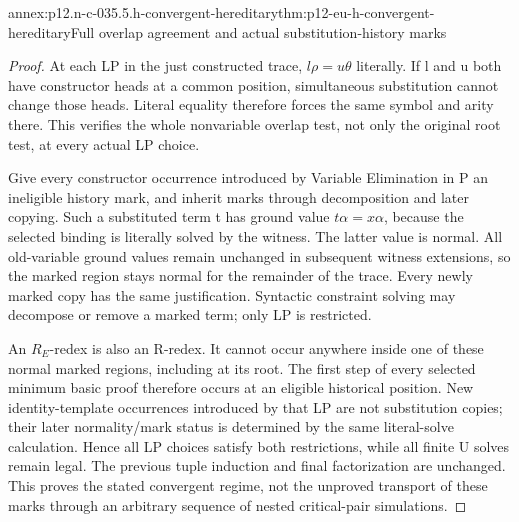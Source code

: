 \begin{annexitem}{annex:p12.n-c-035.5.h-convergent-hereditary}{thm:p12-eu-h-convergent-hereditary}{Full overlap agreement and actual substitution-history marks}
\begin{proof}
At each LP in the just constructed trace, \(l\rho=u\theta\)
literally. If l and u both have constructor heads at a common
position, simultaneous substitution cannot change those heads.
Literal equality therefore forces the same symbol and arity
there. This verifies the whole nonvariable overlap test, not
only the original root test, at every actual LP choice.

Give every constructor occurrence introduced by Variable
Elimination in P an ineligible history mark, and inherit marks
through decomposition and later copying. Such a substituted
term t has ground value \(t\alpha=x\alpha\), because the
selected binding is literally solved by the witness. The latter
value is normal. All old-variable ground values remain unchanged
in subsequent witness extensions, so the marked region stays
normal for the remainder of the trace. Every newly marked copy
has the same justification. Syntactic constraint solving may
decompose or remove a marked term; only LP is restricted.

An \(R_E\)-redex is also an R-redex. It cannot occur anywhere
inside one of these normal marked regions, including at its
root. The first step of every selected minimum basic proof
therefore occurs at an eligible historical position. New
identity-template occurrences introduced by that LP are not
substitution copies; their later normality/mark status is
determined by the same literal-solve calculation. Hence all
LP choices satisfy both restrictions, while all finite U
solves remain legal. The previous tuple induction and final
factorization are unchanged. This proves the stated convergent
regime, not the unproved transport of these marks through an
arbitrary sequence of nested critical-pair simulations.
\end{proof}
\end{annexitem}

